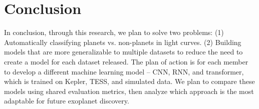 \documentclass[letterpaper]{article} %
\begin{document}
\section*{Conclusion}
In conclusion, through this research, we plan to solve two problems: (1) Automatically classifying planets vs. non-planets in light curves. (2) Building models that are more generalizable to multiple datasets to reduce the need to create a model for each dataset released. The plan of action is for each member to develop a different machine learning model – CNN, RNN, and transformer, which is trained on Kepler, TESS, and simulated data. We plan to compare these models using shared evaluation metrics, then analyze which approach is the most adaptable for future exoplanet discovery.


\end{document}
